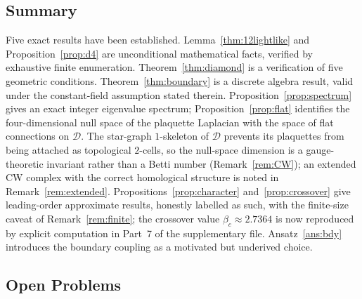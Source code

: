 \documentclass[12pt, a4paper]{article}
\theoremstyle{plain}
\theoremstyle{definition}
\theoremstyle{remark}
\newcommand{\CD}{\mathscr{D}}
\newcommand{\Cstar}{\beta_c}
\begin{document}
\subsection{Summary}
 
Five exact results have been established.
Lemma~\ref{thm:12lightlike} and Proposition~\ref{prop:d4} are
unconditional mathematical facts, verified by exhaustive finite
enumeration.
Theorem~\ref{thm:diamond} is a verification of five geometric
conditions.
Theorem~\ref{thm:boundary} is a discrete algebra result, valid
under the constant-field assumption stated therein.
Proposition~\ref{prop:spectrum} gives an exact integer eigenvalue
spectrum; Proposition~\ref{prop:flat} identifies the four-dimensional
null space of the plaquette Laplacian with the space of flat
connections on $\CD$.
The star-graph $1$-skeleton of $\CD$ prevents its plaquettes from
being attached as topological $2$-cells, so the null-space dimension
is a gauge-theoretic invariant rather than a Betti number
(Remark~\ref{rem:CW}); an extended CW complex with the correct
homological structure is noted in Remark~\ref{rem:extended}.
Propositions~\ref{prop:character} and~\ref{prop:crossover} give
leading-order approximate results, honestly labelled as such,
with the finite-size caveat of Remark~\ref{rem:finite};
the crossover value $\Cstar\approx 2.7364$ is now reproduced
by explicit computation in Part~7 of the supplementary file.
Ansatz~\ref{ans:bdy} introduces the boundary coupling as a
motivated but underived choice.

\subsection{Open Problems}
\end{document}
